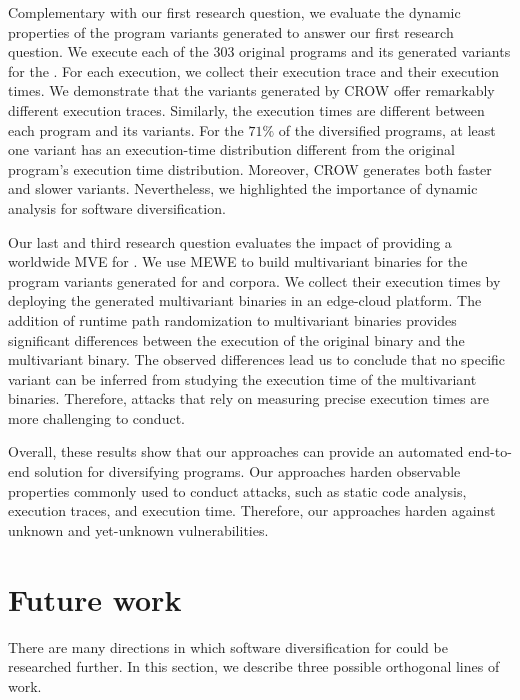 Complementary with our first research question, we evaluate the dynamic properties of the program variants generated to answer our first research question.
We execute each of the 303 original programs and its generated variants for the \corpusrosetta.
For each execution, we collect their execution trace and their execution times.
We demonstrate that the \wasm variants generated by CROW offer remarkably different execution traces.
Similarly, the execution times are different between each program and its variants.
For the $71\%$ of the diversified programs, at least one variant has an execution-time distribution different from the original program's execution time distribution.
Moreover, CROW generates both faster and slower variants.
Nevertheless, we highlighted the importance of dynamic analysis for software diversification. 

Our last and third research question evaluates the impact of providing a worldwide MVE for \wasm.
We use MEWE to build multivariant binaries for the program variants generated for \corpussodium and \corpusqrcode corpora.
We collect their execution times by deploying the generated multivariant binaries in an edge-cloud platform.
The addition of runtime path randomization to multivariant binaries provides significant differences between the execution of the original binary and the multivariant binary.
The observed differences lead us to conclude that no specific variant can be inferred from studying the execution time of the multivariant binaries. Therefore, attacks that rely on measuring precise execution times are more challenging to conduct.


Overall, these results show that our approaches can provide an automated end-to-end solution for diversifying \wasm programs. 
Our approaches harden observable properties commonly used to conduct attacks, such as static code analysis, execution traces, and execution time.
Therefore, our approaches harden \wasm against unknown and yet-unknown vulnerabilities.


\section{Future work}
\label{future_work}

There are many directions in which software diversification for \wasm could be researched further.
In this section, we describe three possible orthogonal lines of work.

\\
\\

